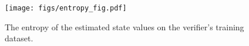 \begin{figure}[h!]
    \centering
    \texttt{[image: figs/entropy\_fig.pdf]}    
    \caption{The entropy of the estimated state values on the verifier's training dataset.}
    \label{fig:entropy}
\end{figure}
